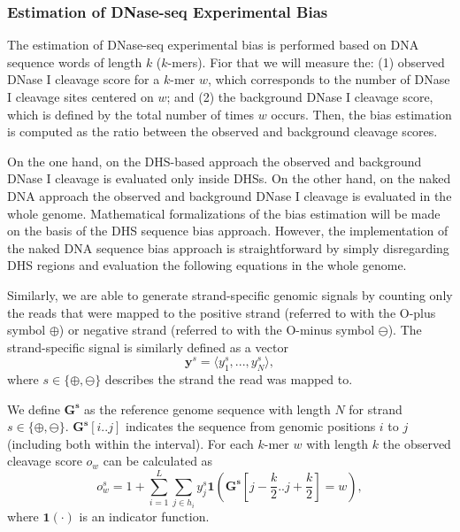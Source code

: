 \subsubsection{Estimation of DNase-seq Experimental Bias}
\label{sec:estimation.dnase.experimental.bias}

The estimation of DNase-seq experimental bias is performed based on DNA sequence words of length $k$ ($k$-mers). Fior that we will measure the: (1) observed DNase I cleavage score for a $k$-mer $w$, which corresponds to the number of DNase I cleavage sites centered on $w$; and (2) the background DNase I cleavage score, which is defined by the total number of times $w$ occurs. Then, the bias estimation is computed as the ratio between the observed and background cleavage scores. 

On the one hand, on the DHS-based approach the observed and background DNase I cleavage is evaluated only inside DHSs. On the other hand, on the naked DNA approach the observed and background DNase I cleavage is evaluated in the whole genome. Mathematical formalizations of the bias estimation will be made on the basis of the DHS sequence bias approach. However, the implementation of the naked DNA sequence bias approach is straightforward by simply disregarding DHS regions and evaluation the following equations in the whole genome.

Similarly, we are able to generate strand-specific genomic signals by counting only the reads that were mapped to the positive strand (referred to with the O-plus symbol $\oplus$) or negative strand (referred to with the O-minus symbol $\ominus$). The strand-specific signal is similarly defined as a vector
\begin{equation}
  \label{eq:raw.signal.strand}
  \mathbf{y}^{s} = \langle{y}_{1}^{s},...,{y}_{N}^{s}\rangle,
\end{equation}
where $s \in \{\oplus,\ominus\}$ describes the strand the read was mapped to.

We define $\mathbf{G^s}$ as the reference genome sequence with length $N$ for strand $s \in \{\oplus,\ominus\}$. $\mathbf{G^s}[i..j]$ indicates the sequence from genomic positions $i$ to $j$ (including both within the interval). For each $k$-mer $w$ with length $k$ the observed cleavage score ${o}_{w}$ can be calculated as
\begin{equation}
  \label{eq:obscleav}
  o_w^s = 1 + \sum_{i=1}^L \sum_{j \in h_i} y^s_j \mathbf{1}\left( \mathbf{G^s}[j-\frac{k}{2} .. j+\frac{k}{2}] = w\right),
\end{equation}
where ${\mathbf{1}}(\cdot)$ is an indicator function.

